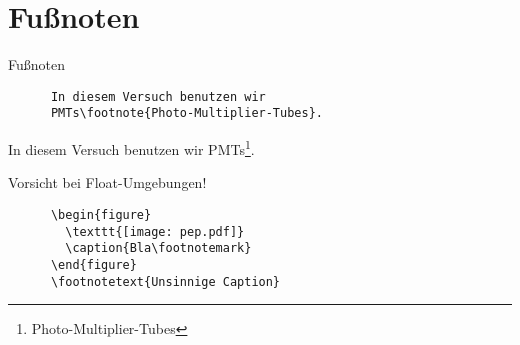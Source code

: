 \section{Fußnoten}
\begin{frame}[fragile]{Fußnoten}
  \begin{CodeExample}{0.5}
    \begin{lstlisting}
      In diesem Versuch benutzen wir 
      PMTs\footnote{Photo-Multiplier-Tubes}.
    \end{lstlisting}
    \CodeResult
    In diesem Versuch benutzen wir PMTs\footnote{Photo-Multiplier-Tubes}.
  \end{CodeExample}
  

  \begin{alertblock}{Vorsicht bei Float-Umgebungen!}
    \begin{lstlisting}
      \begin{figure}
        \texttt{[image: pep.pdf]}
        \caption{Bla\footnotemark}
      \end{figure}
      \footnotetext{Unsinnige Caption}
    \end{lstlisting}
  \end{alertblock}
\end{frame}


